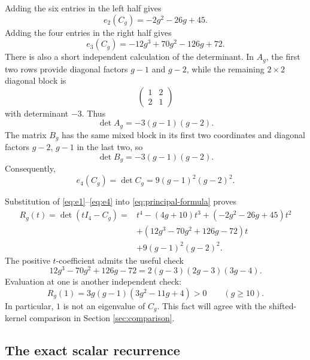 \documentclass[11pt]{article}
\theoremstyle{remark}
\numberwithin{equation}{section}
\begin{document}
Adding the six entries in the left half gives
\begin{equation}\label{eq:e2}
e_2(C_g)=-2g^2-26g+45.
\end{equation}
Adding the four entries in the right half gives
\begin{equation}\label{eq:e3}
e_3(C_g)=-12g^3+70g^2-126g+72.
\end{equation}
There is also a short independent calculation of the determinant.  In
\(A_g\), the first two rows provide diagonal factors \(g-1\) and \(g-2\),
while the remaining \(2\times2\) diagonal block is
\[
\begin{pmatrix}1&2\\2&1\end{pmatrix}
\]
with determinant \(-3\).  Thus
\[
\det A_g=-3(g-1)(g-2).
\]
The matrix \(B_g\) has the same mixed block in its first two coordinates
and diagonal factors \(g-2\), \(g-1\) in the last two, so
\[
\det B_g=-3(g-1)(g-2).
\]
Consequently,
\begin{equation}\label{eq:e4}
e_4(C_g)=\det C_g=9(g-1)^2(g-2)^2.
\end{equation}

Substitution of \eqref{eq:e1}--\eqref{eq:e4} into
\eqref{eq:principal-formula} proves
\begin{equation}\label{eq:R}
\begin{aligned}
R_g(t)=\det(tI_4-C_g)
={}&t^4-(4g+10)t^3+(-2g^2-26g+45)t^2\\
&+(12g^3-70g^2+126g-72)t\\
&+9(g-1)^2(g-2)^2.
\end{aligned}
\end{equation}
The positive \(t\)-coefficient admits the useful check
\begin{equation}\label{eq:t-factor}
12g^3-70g^2+126g-72
=2(g-3)(2g-3)(3g-4).
\end{equation}
Evaluation at one is another independent check:
\begin{equation}\label{eq:R-one}
R_g(1)=3g(g-1)(3g^2-11g+4)>0
\qquad(g\geq10).
\end{equation}
In particular, \(1\) is not an eigenvalue of \(C_g\).  This fact will agree
with the shifted-kernel comparison in Section \ref{sec:comparison}.

\subsection{The exact scalar recurrence}
\end{document}
